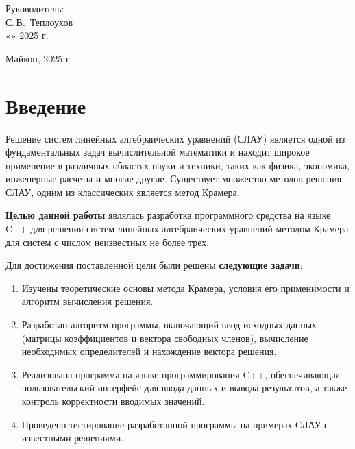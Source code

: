 \documentclass[12pt,a4paper]{scrartcl}
\begin{document}
\begin{titlepage}
		\hfill\begin{minipage}{0.5\textwidth}
			Руководитель:\\
			\underline{\hspace{\ML}} С.\,В.~Теплоухов\\
			«\underline{\hspace{0.7cm}}» \underline{\hspace{2cm}} 2025 г.
		\end{minipage}%
		\vfill
		
		\begin{center}
			Майкоп, 2025 г.
		\end{center}
	\end{titlepage}
	
	

	\newpage 
	\tableofcontents 
	
	
	\newpage
	
	\section{Введение}

	Решение систем линейных алгебраических уравнений (СЛАУ) является одной из фундаментальных задач вычислительной математики и находит широкое применение в различных областях науки и техники, таких как физика, экономика, инженерные расчеты и многие другие. Существует множество методов решения СЛАУ, одним из классических является метод Крамера.
	
	\textbf{Целью данной работы} являлась разработка программного средства на языке C++ для решения систем линейных алгебраических уравнений методом Крамера для систем с числом неизвестных не более трех.
	
	Для достижения поставленной цели были решены \textbf{следующие задачи}:
	\begin{enumerate}
		\item Изучены теоретические основы метода Крамера, условия его применимости и алгоритм вычисления решения.
		\item Разработан алгоритм программы, включающий ввод исходных данных (матрицы коэффициентов и вектора свободных членов), вычисление необходимых определителей и нахождение вектора решения.
		\item Реализована программа на языке программирования C++, обеспечивающая пользовательский интерфейс для ввода данных и вывода результатов, а также контроль корректности вводимых значений.
		\item Проведено тестирование разработанной программы на примерах СЛАУ с известными решениями.
	\end{enumerate}
	
\end{document}
